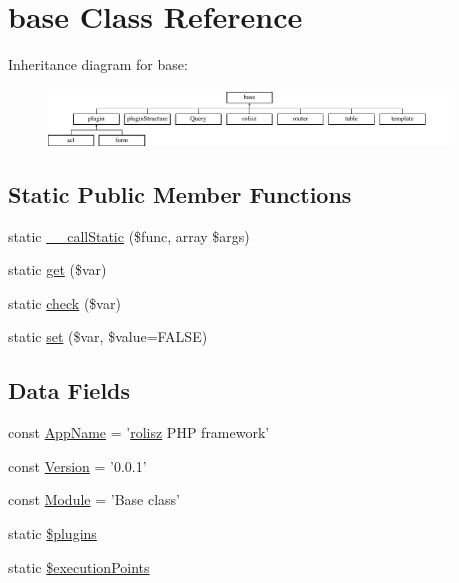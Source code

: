 \hypertarget{classbase}{
\section{base Class Reference}
\label{classbase}
}
Inheritance diagram for base:\begin{figure}[H]
\begin{center}
\leavevmode
\includegraphics[height=1.509434cm]{classbase}
\end{center}
\end{figure}
\subsection*{Static Public Member Functions}
\begin{DoxyCompactItemize}
\item 
static \hyperlink{classbase_a9fa8e32de2139fd5e55c102dcdf9120f}{\_\-\_\-callStatic} (\$func, array \$args)
\item 
static \hyperlink{classbase_a0e8f3e2708d9f0c6ee7b54599f57ea34}{get} (\$var)
\item 
static \hyperlink{classbase_ae09ec448121b7c739ecd283675056e1f}{check} (\$var)
\item 
static \hyperlink{classbase_adc76e59111cb34cf88726e6f3bd0be8b}{set} (\$var, \$value=FALSE)
\end{DoxyCompactItemize}
\subsection*{Data Fields}
\begin{DoxyCompactItemize}
\item 
const \hyperlink{classbase_aab75444b144ffc4e972a9170e0a76ec0}{AppName} = '\hyperlink{classrolisz}{rolisz} PHP framework'
\item 
const \hyperlink{classbase_a62e44de9100d83ee01f5b4875b49a02b}{Version} = '0.0.1'
\item 
const \hyperlink{classbase_a2c348358c1db4bb5136855f7f31e1157}{Module} = 'Base class'
\item 
static \hyperlink{classbase_a4ab51386acb82cd0a0066eac2567b2bd}{\$plugins}
\item 
static \hyperlink{classbase_a878a31351411a5b5d68c12c87c154084}{\$executionPoints}
\end{DoxyCompactItemize}
